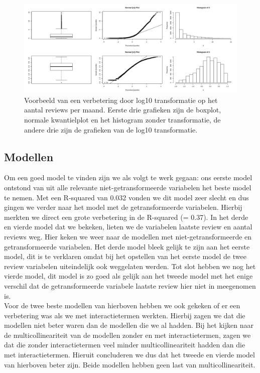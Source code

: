\documentclass[a4paper,kulak]{kulakarticle} %
\begin{document}
\begin{figure}[H]
	\centering
	\includegraphics[width=\textwidth]{transformatieVb.jpeg}
	\caption{Voorbeeld van een verbetering door log10 transformatie op het aantal reviews per maand. Eerste drie grafieken zijn de boxplot, normale kwantielplot en het histogram zonder transformatie, de andere drie zijn de grafieken van de log10 transformatie.}
	\label{fig:transformVb}
\end{figure}

\subsection{Modellen}
Om een goed model te vinden zijn we als volgt te werk gegaan: ons eerste model ontstond van uit alle relevante niet-getransformeerde variabelen het beste model te nemen. Met een R-squared van 0.032 vonden we dit model zeer slecht en dus gingen we verder naar het model met de getransformeerde variabelen. Hierbij merkten we direct een grote verbetering in de R-squared (= 0.37). In het derde en vierde model dat we bekeken, lieten we de variabelen laatste review en aantal reviews weg. Hier keken we weer naar de modellen met niet-getransformeerde en getransformeerde variabelen. Het derde model bleek gelijk te zijn aan het eerste model, dit is te verklaren omdat bij het opstellen van het eerste model de twee review variabelen uiteindelijk ook weggelaten werden. Tot slot hebben we nog het vierde model, dit model is zo goed als gelijk aan het tweede model met het enige verschil dat de getransformeerde variabele laatste review hier niet in meegenomen is. \\

Voor de twee beste modellen van hierboven hebben we ook gekeken of er een verbetering was als we met interactietermen werkten. Hierbij zagen we dat die modellen niet beter waren dan de modellen die we al hadden. Bij het kijken naar de multicollineariteit van de modellen zonder en met interactietermen, zagen we dat die zonder interactietermen veel minder multicollineariteit hadden dan die met interactietermen. Hieruit concluderen we dus dat het tweede en vierde model van hierboven beter zijn. Beide modellen hebben geen last van multicollineariteit.\\
\end{document}
